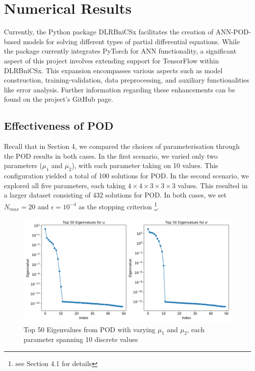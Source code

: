 \section{Numerical Results}

Currently, the Python package DLRBniCSx facilitates the creation of ANN-POD-based models for solving different types of partial differential equations. While the package currently integrates PyTorch for ANN functionality, a significant aspect of this project involves extending support for TensorFlow within DLRBniCSx. This expansion encompasses various aspects such as model construction, training-validation, data preprocessing, and auxiliary functionalities like error analysis. Further information regarding these enhancements can be found on the project's GitHub page.

\subsection{Effectiveness of POD}

Recall that in Section 4, we compared the choices of parameterisation through the POD results in both cases. In the first scenario, we varied only two parameters ($\mu_1$ and $\mu_2$), with each parameter taking on 10 values. This configuration yielded a total of 100 solutions for POD. In the second scenario, we explored all five parameters, each taking $4 \times 4 \times 3 \times 3 \times 3$ values. This resulted in a larger dataset consisting of 432 solutions for POD. In both cases, we set $N_{max} = 20$ and $\epsilon = 10^{-4}$ as the stopping criterion \footnote{see Section 4.1 for details}.


\begin{figure}[!h]
    \centering
    \includegraphics[width=0.8\linewidth]{fig_pod/eigendecay_10,10.png}
    \caption{Top 50 Eigenvalues from POD with varying $\mu_1$ and $\mu_2$, each parameter spanning 10 discrete values}
    \label{fig:eigendecay_10by10}
\end{figure}

